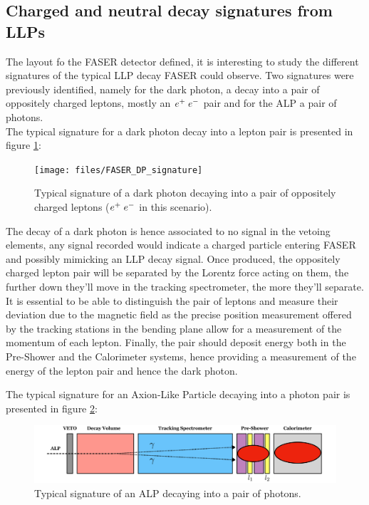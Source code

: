 		\subsection{Charged and neutral decay signatures from LLPs}
		The layout fo the FASER detector defined, it is interesting to study the different signatures of the typical LLP decay FASER could observe. Two signatures were previously identified, namely for the dark photon, a decay into a pair of oppositely charged leptons, mostly an $e^+ \hspace{1mm} e^-$ pair and for the ALP a pair of photons. \\ 
		
		The typical signature for a dark photon decay into a lepton pair is presented in figure \ref{im:FASER_OLD_DP_signature}: 
		\begin{figure}[h]
			\centering
			\texttt{[image: files/FASER\_DP\_signature]}
			\caption{Typical signature of a dark photon decaying into a pair of oppositely charged leptons ($e^+ \hspace{1mm} e^-$ in this scenario).}
			\label{im:FASER_OLD_DP_signature}
		\end{figure}	
		
		The  decay of a dark photon is hence associated to no signal in the vetoing elements, any signal recorded would indicate a charged particle entering FASER and possibly mimicking an LLP decay signal. Once produced, the oppositely charged lepton pair will be separated by the Lorentz force acting on them, the further down they'll move in the tracking spectrometer, the more they'll separate. It is essential to be able to distinguish the pair of leptons and measure their deviation due to the magnetic field as the precise position measurement offered by the tracking stations in the bending plane allow for a measurement of the momentum of each lepton. Finally, the pair should deposit energy both in the Pre-Shower and the Calorimeter systems, hence providing a measurement of the energy of the lepton pair and hence the dark photon.
		
		The typical signature for an Axion-Like Particle decaying into a photon pair is presented in figure \ref{im:FASER_OLD_ALP_signature}: 
		\begin{figure}[h]
			\centering
			\includegraphics[width=1.0\linewidth]{files/FASER_ALP_signature}
			\caption{Typical signature of an ALP decaying into a pair of photons.}
			\label{im:FASER_OLD_ALP_signature}
		\end{figure}
	
